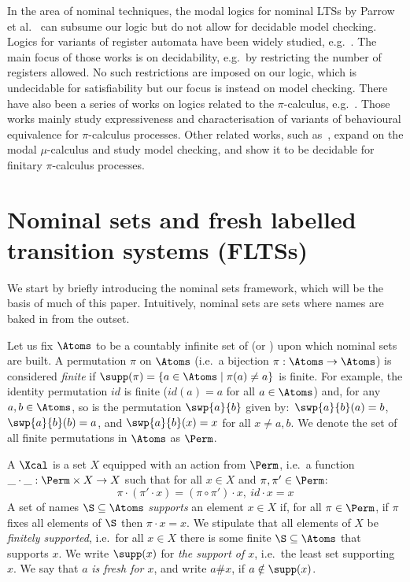 In the area of nominal techniques, the modal logics for nominal LTSs by Parrow et al.~\cite{NomLogics} can subsume our logic but do not allow for decidable model checking.
Logics for variants of register automata have been widely studied, e.g.~\cite{DBLP:conf/csl/Segoufin06,DBLP:journals/tocl/DemriL09,DBLP:conf/mfcs/FigueiraS09}.
The main focus of those works is on decidability, e.g.\ by restricting the number of registers allowed. No such restrictions are imposed on our logic, which is undecidable for satisfiability but our focus is instead on model checking.
There have also been a series of works on logics related to the $\pi$-calculus, e.g.~\cite{DBLP:journals/mscs/NicolaL08,DBLP:journals/cl/KoutavasH12,DBLP:conf/icalp/BergerHY08}.
Those works mainly study expressiveness and characterisation of variants of behavioural equivalence for $\pi$-calculus processes. 
Other related works, such as~\cite{DBLP:journals/iandc/Dam96,BradfieldStevens99}, expand on the modal $\mu$-calculus and study model checking, and show it to be decidable for finitary $\pi$-calculus processes. 




\section{Nominal sets and fresh labelled transition systems (FLTSs)}

We start by briefly introducing the nominal sets framework, which will be the basis of much of this paper. Intuitively, nominal sets are sets where names are baked in from the outset.

Let us fix $\Atoms$ to be a countably infinite set of  (or ) upon which nominal sets are built. 
    A permutation $\pi$ on $\Atoms$ (i.e.\ a bijection $\pi:\Atoms\to\Atoms$) is considered \emph{finite} if $\supp(\pi) = \{a \in \Atoms\mid \pi(a) \neq a\}$ is finite.
 For example, the identity permutation $id$ is finite ($id(a)=a$ for all $a\in\Atoms$) and, for any $a,b\in\Atoms$, so is the permutation $\swp{a}{b}$ given by:\ 
$\swp{a}{b}(a) = b$, $\swp{a}{b}(b) = a$, and $\swp{a}{b}(x) = x$ for all $x\neq a,b$.  
 We denote the set of all finite permutations in $\Atoms$ as $\Perm$.
                       
\begin{definition}[\cite{PittsGabbay,Pitts}]\label{def:nomset}
    A  $\Xcal$ is a set $X$ equipped with an action from $\Perm$, i.e.\ a function $\_ \cdot \_: \Perm \times X \rightarrow X$ such that for all $x \in X$ and  $\pi, \pi' \in \Perm$:
    \[
    \pi \cdot (\pi' \cdot x) = (\pi \circ \pi') \cdot x,\ id \cdot x = x
    \]
    A set of names $\S\subseteq \Atoms$ \emph{supports} an element $x \in X$ if, for all $\pi \in \Perm$, if $\pi$ fixes all elements of $\S$ then $\pi\cdot x=x$. We stipulate that all elements of $X$ be \emph{finitely supported}, i.e.\ for all $x\in X$ there is some finite $\S\subseteq\Atoms$ that supports $x$. We write $\supp(x)$ for \emph{the support of $x$}, i.e.\ the least set supporting $x$. We say that $a$ \emph{is fresh for $x$}, and write $a\# x$, if $a\notin\supp(x)$.
\end{definition}

